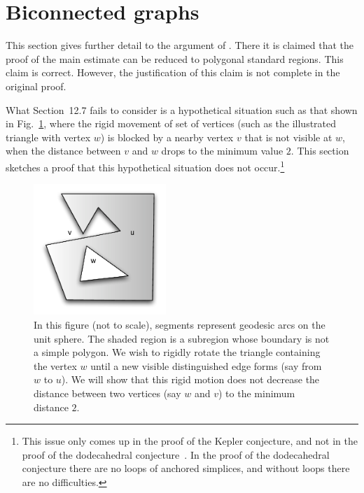 \documentclass[11pt]{amsart}
\begin{document}
\section{Biconnected graphs}


This section gives further detail to the argument of \cite[Sec.12.7~p.131]{Hales:2006:DCG}.  There it is claimed that
the proof of the main estimate \cite[Theorem~12.1]{Hales:2006:DCG} can be reduced to polygonal standard regions.
This claim is correct. 
However, the justification of this claim is not complete in the original proof. 

What Section~12.7 fails to consider
is a hypothetical situation such as that shown in Fig.~\ref{fig:biconnected}, where the rigid movement of set of vertices (such as the illustrated triangle with vertex $w$)
is blocked by a nearby vertex $v$ that is not visible at $w$, when the distance between $v$ and $w$ drops
to the minimum value $2$.  This section sketches a proof that this hypothetical situation does
not occur.\footnote{This issue only comes up in the proof of the Kepler conjecture, and not
in the proof of the dodecahedral conjecture~\cite{Hales:2008:Dodec}.  In the proof of the dodecahedral conjecture there are no loops of anchored simplices, and without loops there are no difficulties.}  



\begin{figure}
\begin{center}
\includegraphics[width=5cm]{biconnected}
\end{center}
\caption{In this figure (not to scale), segments represent geodesic arcs on the unit sphere.  The shaded region is a subregion whose boundary is not a simple polygon.
We wish to rigidly rotate the triangle containing the vertex $w$ until a new visible distinguished edge forms
(say from $w$ to $u$).  We will show that this rigid motion does not decrease the distance between
two vertices (say $w$ and $v$)  to the minimum distance $2$.}
\label{fig:biconnected}
\end{figure}
\end{document}
